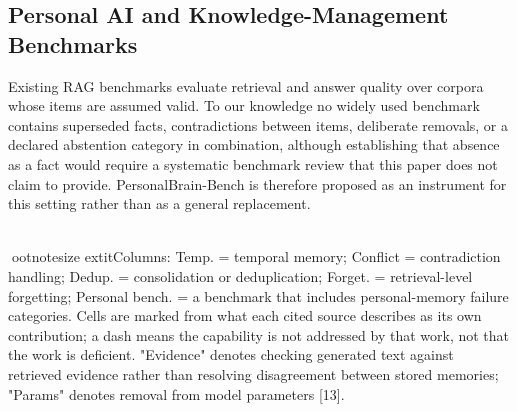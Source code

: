 \documentclass[conference]{IEEEtran}
\begin{document}
\subsection{Personal AI and Knowledge-Management Benchmarks}
Existing RAG benchmarks evaluate retrieval and answer quality over corpora whose items are assumed valid. To our knowledge no widely used benchmark contains superseded facts, contradictions between items, deliberate removals, or a declared abstention category in combination, although establishing that absence as a fact would require a systematic benchmark review that this paper does not claim to provide. PersonalBrain-Bench is therefore proposed as an instrument for this setting rather than as a general replacement.
\begin{table}[!t]
\caption{Research Gap Comparison}
\label{tab:i}
\centering
{}
\\[2pt]ootnotesize	extit{Columns: Temp. = temporal memory; Conflict = contradiction handling; Dedup. = consolidation or deduplication; Forget. = retrieval-level forgetting; Personal bench. = a benchmark that includes personal-memory failure categories. Cells are marked from what each cited source describes as its own contribution; a dash means the capability is not addressed by that work, not that the work is deficient. "Evidence" denotes checking generated text against retrieved evidence rather than resolving disagreement between stored memories; "Params" denotes removal from model parameters [13].}
\end{table}
\end{document}
